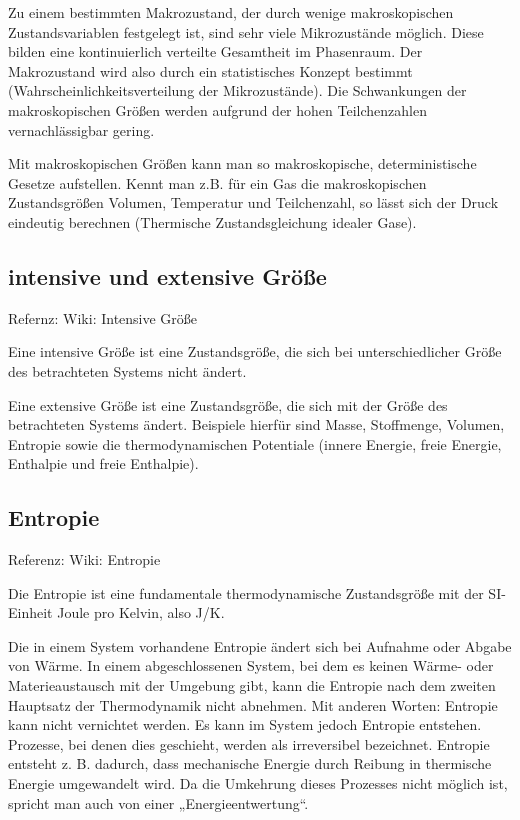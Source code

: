 \documentclass[]{article}
\begin{document}
Zu einem bestimmten Makrozustand, der durch wenige makroskopischen Zustandsvariablen festgelegt ist, sind sehr viele Mikrozustände möglich. Diese bilden eine kontinuierlich verteilte Gesamtheit im Phasenraum. Der Makrozustand wird also durch ein statistisches Konzept bestimmt (Wahrscheinlichkeitsverteilung der Mikrozustände). Die Schwankungen der makroskopischen Größen werden aufgrund der hohen Teilchenzahlen vernachlässigbar gering.

Mit makroskopischen Größen kann man so makroskopische, deterministische Gesetze aufstellen. Kennt man z.B. für ein Gas die makroskopischen Zustandsgrößen Volumen, Temperatur und Teilchenzahl, so lässt sich der Druck eindeutig berechnen (Thermische Zustandsgleichung idealer Gase).

\subsection{intensive und extensive Größe}
Refernz: Wiki: Intensive Größe

Eine intensive Größe ist eine Zustandsgröße, die sich bei unterschiedlicher Größe des betrachteten Systems nicht ändert.

Eine extensive Größe ist eine Zustandsgröße, die sich mit der Größe des betrachteten Systems ändert. Beispiele hierfür sind Masse, Stoffmenge, Volumen, Entropie sowie die thermodynamischen Potentiale (innere Energie, freie Energie, Enthalpie und freie Enthalpie). 

\subsection{Entropie}
Referenz: Wiki: Entropie

Die Entropie ist eine fundamentale thermodynamische Zustandsgröße mit der SI-Einheit Joule pro Kelvin, also J/K.

Die in einem System vorhandene Entropie ändert sich bei Aufnahme oder Abgabe von Wärme. In einem abgeschlossenen System, bei dem es keinen Wärme- oder Materieaustausch mit der Umgebung gibt, kann die Entropie nach dem zweiten Hauptsatz der Thermodynamik nicht abnehmen. Mit anderen Worten: Entropie kann nicht vernichtet werden. Es kann im System jedoch Entropie entstehen. Prozesse, bei denen dies geschieht, werden als irreversibel bezeichnet. Entropie entsteht z. B. dadurch, dass mechanische Energie durch Reibung in thermische Energie umgewandelt wird. Da die Umkehrung dieses Prozesses nicht möglich ist, spricht man auch von einer „Energieentwertung“.
\end{document}
